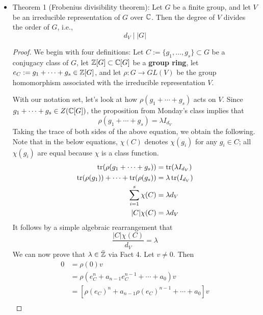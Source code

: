\documentclass[../notes.tex]{subfiles}
\begin{document}
\begin{itemize}
    \item Theorem 1 (Frobenius divisibility theorem): Let $G$ be a finite group, and let $V$ be an irreducible representation of $G$ over $\mathbb{C}$. Then the degree of $V$ divides the order of $G$, i.e.,
    \begin{equation*}
        d_V \mid |G|
    \end{equation*}
    \begin{proof}
        We begin with four definitions: Let $C:=\{g_1,\dots,g_s\}\subset G$ be a conjugacy class of $G$, let $\mathbb{Z}[G]\subset\mathbb{C}[G]$ be a \textbf{group ring}, let $e_C:=g_1+\cdots+g_s\in\mathbb{Z}[G]$, and let $\rho:G\to GL(V)$ be the group homomorphism associated with the irreducible representation $V$.\par
        With our notation set, let's look at how $\rho(g_1+\cdots+g_s)$ acts on $V$. Since $g_1+\cdots+g_s\in Z(\mathbb{C}[G])$, the proposition from Monday's class implies that
        \begin{equation*}
            \rho(g_1+\cdots+g_s) = \lambda I_{d_V}
        \end{equation*}
        Taking the trace of both sides of the above equation, we obtain the following. Note that in the below equations, $\chi(C)$ denotes $\chi(g_i)$ for any $g_i\in C$; all $\chi(g_i)$ are equal because $\chi$ is a class function. 
        \begin{align*}
            \tr(\rho(g_1+\cdots+g_s)) &= \tr(\lambda I_{d_V})\\
            \tr(\rho(g_1))+\cdots+\tr(\rho(g_s)) &= \lambda\tr(I_{d_V})\\
            \sum_{i=1}^s\chi(C) &= \lambda d_V\\
            |C|\chi(C) &= \lambda d_V
        \end{align*}
        It follows by a simple algebraic rearrangement that
        \begin{equation*}
            \frac{|C|\chi(C)}{d_V} = \lambda
        \end{equation*}
        We can now prove that $\lambda\in\bar{\mathbb{Z}}$ via Fact 4. Let $v\neq 0$. Then
        \begin{align*}
            0 &= \rho(0)v\\
            &= \rho(e_C^n+a_{n-1}e_C^{n-1}+\cdots+a_0)v\\
            &= [\rho(e_C)^n+a_{n-1}\rho(e_C)^{n-1}+\cdots+a_0]v\\

\end{align*}
\end{proof}
\end{itemize}
\end{document}
